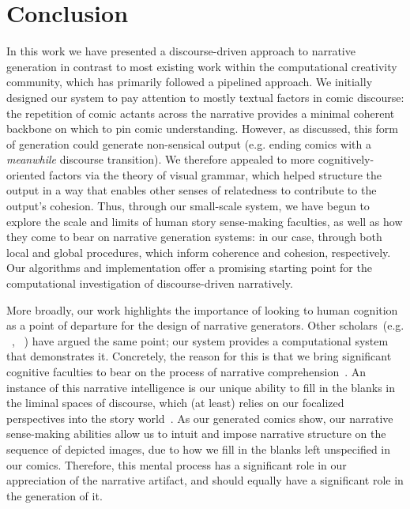 \section{Conclusion}

In this work we have presented a discourse-driven approach to narrative 
generation in contrast to most existing work within the computational 
creativity community, which has primarily followed a pipelined approach.
We initially designed our system to pay attention to mostly textual
factors in comic discourse: the repetition of comic actants across the
narrative provides a minimal coherent backbone on which to pin comic 
understanding.
%
However, as discussed, this form of generation could generate non-sensical
output (e.g. ending comics with a \emph{meanwhile} discourse transition). 
We therefore appealed to more cognitively-oriented factors via the theory
of visual grammar, which helped structure the output in a way that enables
other senses of relatedness to contribute to the output's cohesion.
%
Thus, through our small-scale system, we have begun to explore the scale and
limits of human story sense-making faculties, as well as how they come to
bear on narrative generation systems: in our case, through both local and 
global procedures, which inform coherence and cohesion, respectively. 
%
Our algorithms and implementation offer a promising starting point for the
computational investigation of discourse-driven narratively.

More broadly, our work highlights the importance of looking to human
cognition as a point of departure for the design of narrative generators.
Other scholars~(e.g.
\citeauthor{gervas2009computational}~\citeyear{gervas2009computational}, 
\citeauthor{szilas2010requirements}~\citeyear{szilas2010requirements})
have argued the same point; our system provides a computational system
that demonstrates it. Concretely, the reason for this is that we bring
significant cognitive faculties to bear on the process of narrative 
comprehension~\cite{herman2013storytelling}. 
An instance of this narrative intelligence is our unique ability to fill 
in the blanks in the liminal spaces of discourse, which (at least) relies on  
our focalized perspectives into the story world~\cite{genette1983narrative}.
As our generated comics show, our narrative sense-making abilities allow us 
to intuit and impose narrative structure on the sequence of depicted images, 
due to how we fill in the blanks left unspecified in our comics. Therefore,
this mental process has a significant role in our appreciation of the 
narrative artifact, and should equally have a significant role in the
generation of it.
